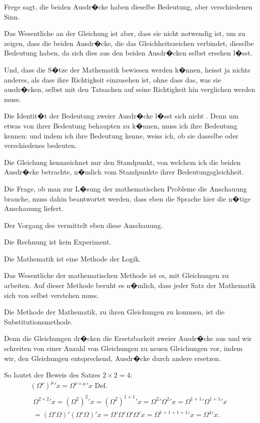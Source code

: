 \begin{propositions}
{Frege sagt, die beiden Ausdr�cke haben dieselbe
Bedeutung, aber verschiedenen Sinn.

Das Wesentliche an der Gleichung ist aber, dass
sie nicht notwendig ist, um zu zeigen, dass die beiden
Ausdr�cke, die das Gleichheitszeichen verbindet,
dieselbe Bedeutung haben, da sich dies aus den
beiden Ausdr�cken selbst ersehen l�sst.}


{Und, dass die S�tze der Mathematik bewiesen
werden k�nnen, heisst ja nichts anderes, als dass
ihre Richtigkeit einzusehen ist, ohne dass das, was
sie ausdr�cken, selbst mit den Tatsachen auf seine
Richtigkeit hin verglichen werden muss.}


{Die Identit�t der Bedeutung zweier Ausdr�cke
l�sst sich nicht . Denn um etwas von
ihrer Bedeutung behaupten zu k�nnen, muss ich
ihre Bedeutung kennen: und indem ich ihre Bedeutung
kenne, weiss ich, ob sie dasselbe oder
verschiedenes bedeuten.}


{Die Gleichung kennzeichnet nur den Standpunkt,
von welchem ich die beiden Ausdr�cke
betrachte, n�mlich vom Standpunkte ihrer Bedeutungsgleichheit.}


{Die Frage, ob man zur L�sung der mathematischen
Probleme die Anschauung brauche, muss
dahin beantwortet werden, dass eben die Sprache
hier die n�tige Anschauung liefert.}


{Der Vorgang des  vermittelt eben
diese Anschauung.

Die Rechnung ist kein Experiment.}


{Die Mathematik ist eine Methode der Logik.}


{Das Wesentliche der mathematischen Methode
ist es, mit Gleichungen zu arbeiten. Auf dieser
Methode beruht es n�mlich, dass jeder Satz der
Mathematik sich von selbst verstehen muss.}


{Die Methode der Mathematik, zu ihren Gleichungen
zu kommen, ist die Substitutionsmethode.

{\verystretchyspace
Denn die Gleichungen dr�cken die Ersetzbarkeit
zweier Ausdr�cke aus und wir schreiten von einer
Anzahl von Gleichungen zu neuen Gleichungen
vor, indem wir, den Gleichungen entsprechend,
Ausdr�cke durch andere ersetzen.}}


{So lautet der Beweis des Satzes $2 \times 2 = 4$:
\begin{gather*}
(\Omega^{\nu})^{\mu}{}'x = \Omega^{\nu \times \mu}{}'x \text{ Def.}\\
\begin{split}
\Omega^{2 \times 2}{}'x = (\Omega^{2})^{2}{}'x = (\Omega^{2})^{1 + 1}{}'x = \Omega^{2}{}'\Omega^{2}{}'x = \Omega^{1 + 1}{}'\Omega^{1 + 1}{}'x\\
= (\Omega'\Omega)'(\Omega'\Omega)'x = \Omega'\Omega'\Omega'\Omega'x = \Omega^{1 + 1 + 1 + 1}{}'x = \Omega^{4}{}'x.
\end{split}
\end{gather*}
}



\end{propositions}
